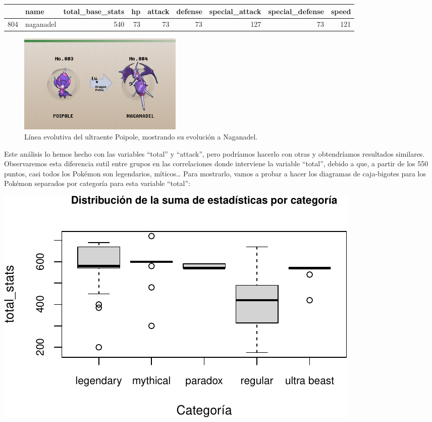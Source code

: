 \documentclass[
  12pt,
]{extreport}
\begin{document}
\begin{itemize}
  \begin{table}[H]
  \centering\begingroup\fontsize{9.5}{11.5}\selectfont

  \begin{tabular}{llrrrrrrr}
  \toprule
    & name & total\_base\_stats & hp & attack & defense & special\_attack & special\_defense & speed\\
  \midrule
  804 & naganadel & 540 & 73 & 73 & 73 & 127 & 73 & 121\\
  \bottomrule
  \end{tabular}
  \endgroup{}
  \end{table}

  \begin{figure}[H]

  {\centering \includegraphics[width=3.125in,height=\textheight]{trabajo_images/Naganadel.png}

  }

  \caption{Línea evolutiva del ultraente Poipole, mostrando su evolución
  a Naganadel.}

  \end{figure}%
\end{itemize}

Este análisis lo hemos hecho con las variables ``total'' y ``attack'',
pero podríamos hacerlo con otras y obtendríamos resultados similares.
Observaremos esta diferencia sutil entre grupos en las correlaciones
donde interviene la variable ``total'', debido a que, a partir de los
550 puntos, casi todos los Pokémon son legendarios, míticos\ldots{} Para
mostrarlo, vamos a probar a hacer los diagramas de caja-bigotes para los
Pokémon separados por categoría para esta variable ``total'':

\begin{center}
\includegraphics{trabajo_files/figure-pdf/unnamed-chunk-20-1.pdf}
\end{center}
\end{document}

